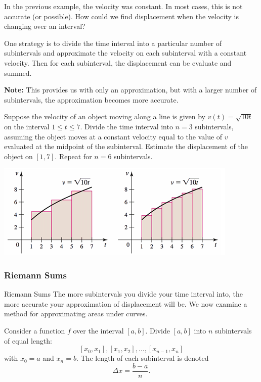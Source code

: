 \documentclass[cal1spr16Lectures.tex]{subfiles}
\begin{document}
\begin{frame}\small
In the previous example, the velocity was constant.  In most cases, this is not accurate (or possible).  How could we find displacement when the velocity is changing over an interval?
\vspace{1pc}

One strategy is to divide the time interval into a particular number of subintervals and approximate the velocity on each subinterval with a constant velocity.  Then for each subinterval, the displacement can be evaluate and summed.
\vspace{1pc}

{\bf Note:}  This provides us with only an approximation, but with a larger number of subintervals, the approximation becomes more accurate.
\end{frame}

\begin{frame}\footnotesize
\begin{ex} 
Suppose the velocity of an object moving along a line is given by $v(t)=\sqrt{10t}$ on the interval $1 \le t \le 7$.  Divide the time interval into $n=3$ subintervals, assuming the object moves at a constant velocity equal to the value of $v$ evaluated at the midpoint of the subinterval.  Estimate the displacement of the object on $[1,7]$.  Repeat for $n=6$ subintervals. 
\vspace{-0.5pc}
\begin{center}
\includegraphics[scale=0.75]{pictures/Ch5Sect1_Exer10}
\end{center}
\end{ex}
\end{frame}

\subsubsection{Riemann Sums}

\begin{frame}{\small Riemann Sums}\footnotesize
The more subintervals you divide your time interval into, the more accurate your approximation of displacement will be.%
We now examine a method for approximating areas under curves.

\vspace{1pc}
Consider a function $f$ over the interval $[a,b]$.  Divide $[a,b]$ into $n$ subintervals of equal length:
\[[x_0,x_1], [x_1,x_2], \dots, [x_{n-1},x_n]\]
with $x_0=a$ and $x_n=b$.  The length of each subinterval is denoted
\[\Delta x = \frac{b-a}{n}.\]
\end{frame}
\end{document}

